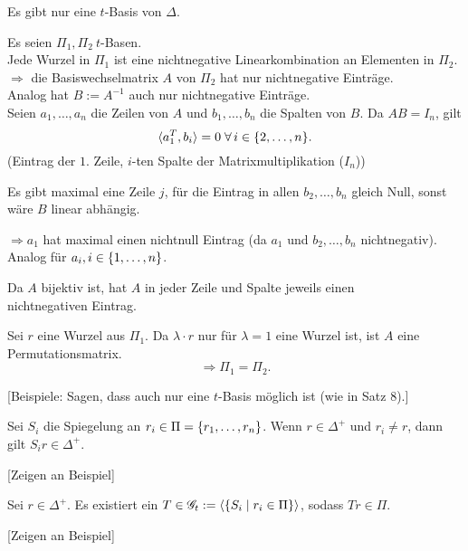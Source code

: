 \documentclass[12pt]{extarticle}
\begin{document}
\begin{satz} %
    Es gibt nur eine \( t \)-Basis von \( \Delta \).
\end{satz}
\begin{bew}
    Es seien \( \Pi_1, \Pi_2\ t \)-Basen.\\
    Jede Wurzel in \( \Pi_1 \) ist eine nichtnegative 
    Linearkombination an Elementen in \( \Pi_2 \).\\
    \( \Rightarrow \) die Basiswechselmatrix \(A\) von 
    \( \Pi_2 \) hat nur nichtnegative Einträge.\\
    Analog hat \( B := A^{-1} \) auch nur nichtnegative 
    Einträge. \\
    Seien \( a_1, \ldots, a_n \) die Zeilen von \(A\) 
    und \( b_1, \ldots, b_n \) die Spalten von \(B\).
    Da \( AB = I_n \), gilt 
    \[ \scalarprod{a_1^T}{b_i} = 0 \;\forall i \in \set{2, \ldots, n}. \]
    (Eintrag der \( 1 \). Zeile, \( i \)-ten Spalte der Matrixmultiplikation (\( I_n \)))

    Es gibt maximal eine Zeile \( j \), für die Eintrag in allen 
    \( b_2, \ldots, b_n \) gleich Null, sonst wäre 
    \(B\) linear abhängig.

    \( \Rightarrow a_1 \) hat maximal einen 
    nichtnull Eintrag (da \(a_1\) und \( b_2, \ldots, b_n \) nichtnegativ).\\
    Analog für \( a_i, i \in \{1, \ldots, n\} \).

    Da \(A\) bijektiv ist, hat \(A\) in jeder Zeile und 
    Spalte jeweils einen \\
    nichtnegativen Eintrag.

    Sei \(r\) eine Wurzel aus \( \Pi_1 \).
    Da \( \lambda \cdot r \) nur für 
    \( \lambda = 1 \) eine Wurzel ist, 
    ist \( A \) eine Permutationsmatrix.
    \[ \Rightarrow \Pi_1 = \Pi_2. \]
\end{bew}

[Beispiele: Sagen, dass auch nur eine \(t\)-Basis 
möglich ist (wie in Satz 8).]

\begin{satz} %
    Sei \( S_i \) die Spiegelung an 
    \( r_i \in \Pi = \{r_1, \ldots, r_n\} \).
    Wenn \( r \in \Delta^+ \) und \( r_i \neq r \), 
    dann gilt \( S_i r \in \Delta^+ \).
\end{satz}
[Zeigen an Beispiel]

\begin{satz} %
    Sei \( r \in \Delta^+ \). Es existiert ein \( T \in 
    \mathscr{G}_t := \langle 
    \{S_i \;\vert\; r_i \in \Pi\} \rangle \), sodass 
    \( Tr \in \Pi \).
\end{satz}
[Zeigen an Beispiel]
\end{document}
